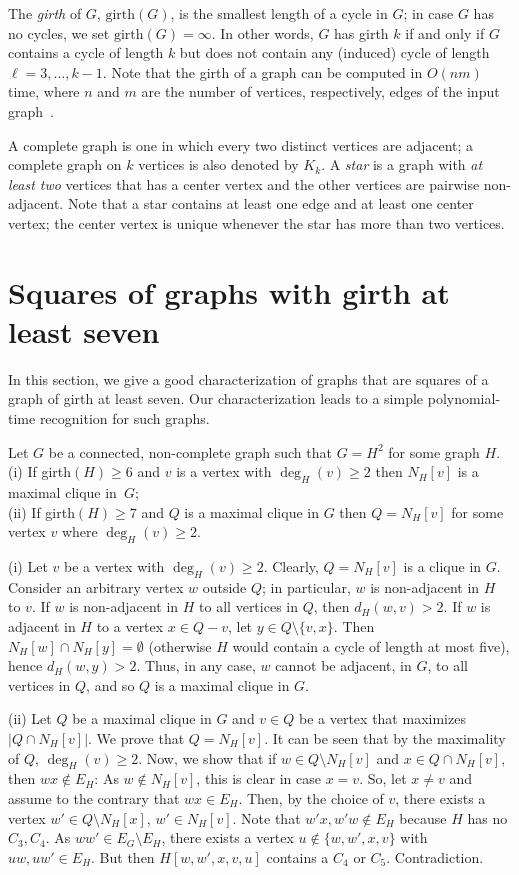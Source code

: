 \documentclass[proceedings]{stacs}
\newlength{\ai}
\begin{document}
The \emph{girth} of $G$, $\text{girth}(G)$, is the smallest length of a cycle in $G$; in
case $G$ has no cycles, we set $\text{girth}(G)=\infty$. In other words, $G$ has girth
$k$ if and only if $G$ contains a cycle of length $k$ but does not contain any (induced)
cycle of length $\ell=3, \ldots, k-1$.
Note that the girth of a graph can be computed
in $O(nm)$ time, where $n$ and $m$ are the number of vertices, respectively, edges of the input
graph~\cite{ItaRod}.

A complete graph is one in which every two distinct vertices are adjacent; a complete graph on $k$
  vertices is also denoted by $K_k$.
A \emph{star} is a graph with \emph{at least two} vertices that has a center vertex and
  the other vertices are pairwise non-adjacent.
Note that a star contains at least one edge and at least one center vertex;
  the center vertex is unique whenever the star has more than two vertices.


\section{Squares of graphs with girth at least seven}\label{sec:girthseven}
In this section, we give a good characterization of graphs that are squares
of a graph of girth at least seven.
Our characterization leads to a simple polynomial-time
recognition for such graphs.
\begin{prop}\label{prop:maxclique}
Let $G$ be a connected, non-complete graph such that $G=H^2$ for some graph $H$. \\
(i)  If girth$(H)\ge 6$ and $v$ is a vertex with $\deg_H(v)\ge 2$ then $N_H[v]$ is a maximal clique in~$G$;\\
(ii) If girth$(H)\ge 7$ and $Q$ is a maximal clique in $G$ then $Q=N_H[v]$ for some vertex $v$ where $\deg_H(v)\ge 2$.
\end{prop}

\proof
(i) Let $v$ be a vertex with $\deg_H(v)\ge 2$. Clearly, $Q=N_H[v]$ is a clique in $G$.
Consider an arbitrary vertex $w$ outside $Q$; in particular, $w$ is non-adjacent in $H$ to $v$.
If $w$ is non-adjacent in $H$ to all vertices in $Q$, then $d_H(w, v) > 2$. If $w$ is adjacent
in $H$ to a vertex $x\in Q-v$, let $y\in Q\setminus\{v, x\}$. Then $N_H[w]\cap N_H[y]=\emptyset$
(otherwise $H$ would contain a cycle of length at most five), hence $d_H(w, y) > 2$. Thus, in
any case, $w$ cannot be adjacent, in $G$, to all vertices in $Q$, and so $Q$ is a maximal
clique in $G$.

(ii) Let $Q$ be a maximal clique in $G$ and $v\in Q$ be a vertex that maximizes $|Q\cap N_H[v]|$.
We prove that $Q=N_H[v]$.
It can be seen that by the maximality of $Q$, $\deg_H(v)\ge 2$.
Now, we show that if $w\in Q\setminus N_H[v]$ and $x\in Q\cap N_H[v]$, then $wx\not\in E_H$:
As $w\not\in N_H[v]$, this is clear in case $x=v$. So, let $x\not= v$ and
assume to the contrary that $wx\in E_H$. Then, by the choice of $v$, there exists a vertex
$w'\in Q\setminus N_H[x]$, $w'\in N_H[v]$. Note that $w'x, w'w\not\in E_H$ because $H$ has no
$C_3, C_4$. As $ww'\in E_G\setminus E_H$, there exists a vertex $u\not\in\{w, w', x, v\}$ with
$uw, uw'\in E_H$. But then $H[w, w', x, v, u]$ contains a $C_4$ or $C_5$. Contradiction.
\end{document}
